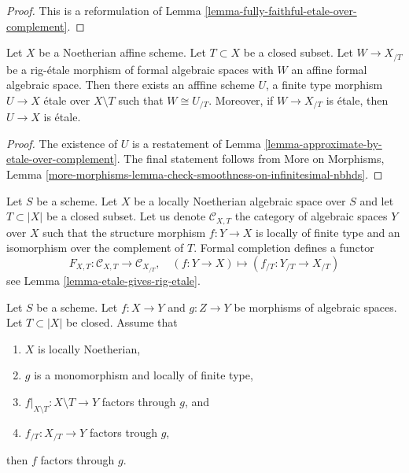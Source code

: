 \begin{proof}
This is a reformulation of
Lemma \ref{lemma-fully-faithful-etale-over-complement}.
\end{proof}

\begin{lemma}
\label{lemma-algebraize-rig-etale-affine}
Let $X$ be a Noetherian affine scheme. Let $T \subset X$ be a closed subset.
Let $W \to X_{/T}$ be a rig-\'etale morphism of formal algebraic
spaces with $W$ an affine formal algebraic space. Then there exists
an afffine scheme $U$, a finite type morphism $U \to X$ \'etale over
$X \setminus T$ such that $W \cong U_{/T}$.
Moreover, if $W \to X_{/T}$ is \'etale, then $U \to X$ is \'etale.
\end{lemma}

\begin{proof}
The existence of $U$ is a restatement of
Lemma \ref{lemma-approximate-by-etale-over-complement}.
The final statement follows from
More on Morphisms, Lemma
\ref{more-morphisms-lemma-check-smoothness-on-infinitesimal-nbhds}.
\end{proof}

\noindent
Let $S$ be a scheme. Let $X$ be a locally Noetherian algebraic space over $S$
and let $T \subset |X|$ be a closed subset. Let us denote
$\mathcal{C}_{X, T}$ the category of algebraic spaces $Y$ over $X$
such that the structure morphism $f : Y \to X$
is locally of finite type and an isomorphism over the complement of
$T$. Formal completion defines a functor
\begin{equation}
\label{equation-completion-functor}
F_{X, T} : \mathcal{C}_{X, T} \longrightarrow \mathcal{C}_{X_{/T}},\quad
(f : Y \to X) \longmapsto (f_{/T} : Y_{/T} \to X_{/T})
\end{equation}
see Lemma \ref{lemma-etale-gives-rig-etale}.

\begin{lemma}
\label{lemma-factor}
Let $S$ be a scheme. Let $f : X \to Y$ and $g : Z \to Y$ be morphisms
of algebraic spaces. Let $T \subset |X|$ be closed.
Assume that
\begin{enumerate}
\item $X$ is locally Noetherian,
\item $g$ is a monomorphism and locally of finite type,
\item $f|_{X \setminus T} : X \setminus T \to Y$ factors through $g$, and
\item $f_{/T} : X_{/T} \to Y$ factors trough $g$,
\end{enumerate}
then $f$ factors through $g$.
\end{lemma}

